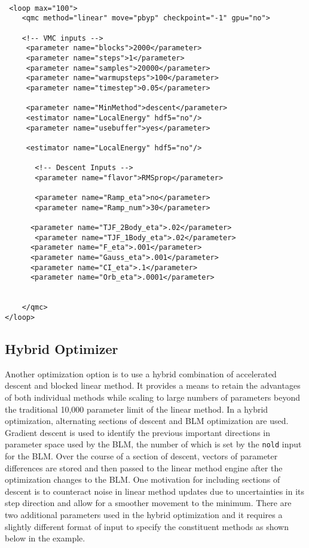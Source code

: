 \begin{lstlisting}[style=QMCPXML]
 
 <loop max="100">
    <qmc method="linear" move="pbyp" checkpoint="-1" gpu="no">
    
    <!-- VMC inputs -->
     <parameter name="blocks">2000</parameter>
     <parameter name="steps">1</parameter>
     <parameter name="samples">20000</parameter>
     <parameter name="warmupsteps">100</parameter>
     <parameter name="timestep">0.05</parameter>

     <parameter name="MinMethod">descent</parameter>
     <estimator name="LocalEnergy" hdf5="no"/>
     <parameter name="usebuffer">yes</parameter>

     <estimator name="LocalEnergy" hdf5="no"/>
           
	   <!-- Descent Inputs -->
       <parameter name="flavor">RMSprop</parameter>

       <parameter name="Ramp_eta">no</parameter>
       <parameter name="Ramp_num">30</parameter>
           
      <parameter name="TJF_2Body_eta">.02</parameter>
       <parameter name="TJF_1Body_eta">.02</parameter>
      <parameter name="F_eta">.001</parameter>
      <parameter name="Gauss_eta">.001</parameter>
      <parameter name="CI_eta">.1</parameter>
      <parameter name="Orb_eta">.0001</parameter>


    </qmc>
</loop> 
 \end{lstlisting}


\subsection{Hybrid Optimizer}

Another optimization option is to use a hybrid combination of accelerated descent and blocked linear method.
It provides a means to retain the advantages of both individual methods while scaling to large numbers of parameters beyond the traditional 10,000 parameter limit of the linear method.\cite{Otis2019}
In a hybrid optimization, alternating sections of descent and BLM optimization are used.
Gradient descent is used to identify the previous important directions in parameter space used by the BLM, the number of which is set by the \texttt{nold} input for the BLM.
Over the course of a section of descent, vectors of parameter differences are stored and then passed to the linear method engine after the optimization changes to the BLM.
One motivation for including sections of descent is to counteract noise in linear method updates due to uncertainties in its step direction and allow for a smoother movement to the minimum.
There are two additional parameters used in the hybrid optimization and it requires a slightly different format of input to specify the constituent methods as shown below in the example.

